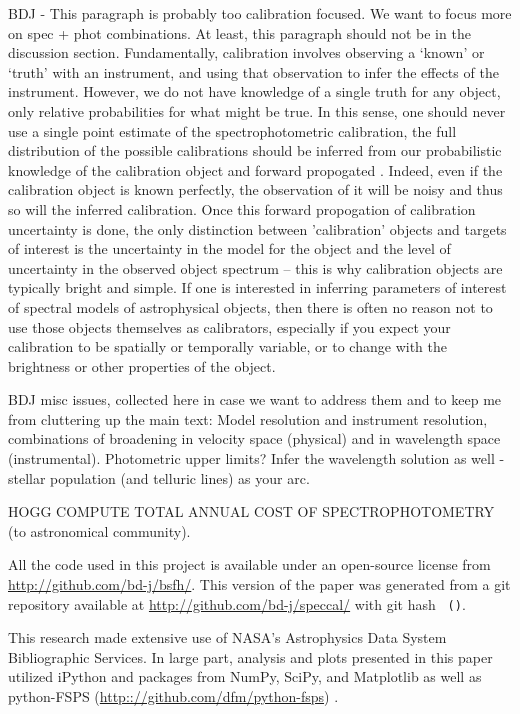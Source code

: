\documentclass[iop,numberedappendix]{emulateapj}
\begin{document}
{\color{blue} BDJ - This paragraph is probably too calibration
focused. We want to focus more on spec + phot combinations.  At least,
this paragraph should not be in the discussion section.}
Fundamentally, calibration involves observing a `known' or `truth'
with an instrument, and using that observation to infer the effects of
the instrument.  However, we do not have knowledge of a single truth
for any object, only relative probabilities for what might be true.
In this sense, one should never use a single point estimate of the
spectrophotometric calibration, the full distribution of the possible
calibrations should be inferred from our probabilistic knowledge of
the calibration object and forward propogated
\citep[e.g.][]{lee11}. Indeed, even if the calibration object is known
perfectly, the observation of it will be noisy and thus so will the
inferred calibration. Once this forward propogation of calibration
uncertainty is done, the only distinction between 'calibration'
objects and targets of interest is the uncertainty in the model for
the object and the level of uncertainty in the observed object
spectrum -- this is why calibration objects are typically bright and
simple.  If one is interested in inferring parameters of interest of
spectral models of astrophysical objects, then there is often no
reason not to use those objects themselves as calibrators,
especially if you expect your calibration to be spatially or 
temporally variable, or to change with the brightness or other
properties of the object.

{\color{blue} BDJ misc issues, collected here in case we want to
address them and to keep me from cluttering up the main text:} Model
resolution and instrument resolution, combinations of broadening in
velocity space (physical) and in wavelength space (instrumental).
Photometric upper limits? Infer the wavelength solution as well -
stellar population (and telluric lines) as your arc.

HOGG COMPUTE TOTAL ANNUAL COST OF SPECTROPHOTOMETRY (to astronomical community).

All the code used in this project is available under an open-source license
  from \url{http://github.com/bd-j/bsfh/}.
This version of the paper was generated
  from a git repository available at \url{http://github.com/bd-j/speccal/}
  with git hash \texttt{\githash\,(\gitdate)}.

\acknowledgements
This research made extensive use of NASA's Astrophysics Data System Bibliographic Services. 
In large part, analysis and plots presented in this paper utilized
  iPython and packages from NumPy, SciPy, and Matplotlib
  \citep[][]{hunter2007, oliphant2007, perez2007} as well
  as python-FSPS  (\url{http:://github.com/dfm/python-fsps}) .
\end{document}
